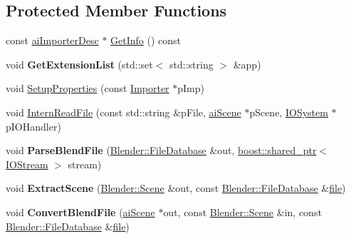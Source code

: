 \subsection*{Protected Member Functions}
\begin{DoxyCompactItemize}
\item 
const \hyperlink{structai_importer_desc}{ai\+Importer\+Desc} $\ast$ \hyperlink{class_assimp_1_1_blender_importer_a8e4035e2db36d6b43cbc1a859642a133}{Get\+Info} () const 
\item 
\hypertarget{class_assimp_1_1_blender_importer_a55d55fd5debf672655ae4c07f9b48511}{void {\bfseries Get\+Extension\+List} (std\+::set$<$ std\+::string $>$ \&app)}\label{class_assimp_1_1_blender_importer_a55d55fd5debf672655ae4c07f9b48511}

\item 
void \hyperlink{class_assimp_1_1_blender_importer_a4c8b1b1c9b79bed2c2a56d56c8060889}{Setup\+Properties} (const \hyperlink{class_assimp_1_1_importer}{Importer} $\ast$p\+Imp)
\item 
void \hyperlink{class_assimp_1_1_blender_importer_aedbc68fb4a33f98473fb5737d7abff3b}{Intern\+Read\+File} (const std\+::string \&p\+File, \hyperlink{structai_scene}{ai\+Scene} $\ast$p\+Scene, \hyperlink{class_assimp_1_1_i_o_system}{I\+O\+System} $\ast$p\+I\+O\+Handler)
\item 
\hypertarget{class_assimp_1_1_blender_importer_a5999035e30635ae9b20cf28ce177f0de}{void {\bfseries Parse\+Blend\+File} (\hyperlink{class_assimp_1_1_blender_1_1_file_database}{Blender\+::\+File\+Database} \&out, \hyperlink{classboost_1_1shared__ptr}{boost\+::shared\+\_\+ptr}$<$ \hyperlink{class_assimp_1_1_i_o_stream}{I\+O\+Stream} $>$ stream)}\label{class_assimp_1_1_blender_importer_a5999035e30635ae9b20cf28ce177f0de}

\item 
\hypertarget{class_assimp_1_1_blender_importer_a3b6e9af55581937f67a04811c10bdaf5}{void {\bfseries Extract\+Scene} (\hyperlink{struct_assimp_1_1_blender_1_1_scene}{Blender\+::\+Scene} \&out, const \hyperlink{class_assimp_1_1_blender_1_1_file_database}{Blender\+::\+File\+Database} \&\hyperlink{structfile}{file})}\label{class_assimp_1_1_blender_importer_a3b6e9af55581937f67a04811c10bdaf5}

\item 
\hypertarget{class_assimp_1_1_blender_importer_a09f3a07f9414d3bfea69c15aab6ebb1d}{void {\bfseries Convert\+Blend\+File} (\hyperlink{structai_scene}{ai\+Scene} $\ast$out, const \hyperlink{struct_assimp_1_1_blender_1_1_scene}{Blender\+::\+Scene} \&in, const \hyperlink{class_assimp_1_1_blender_1_1_file_database}{Blender\+::\+File\+Database} \&\hyperlink{structfile}{file})}\label{class_assimp_1_1_blender_importer_a09f3a07f9414d3bfea69c15aab6ebb1d}

\end{DoxyCompactItemize}
